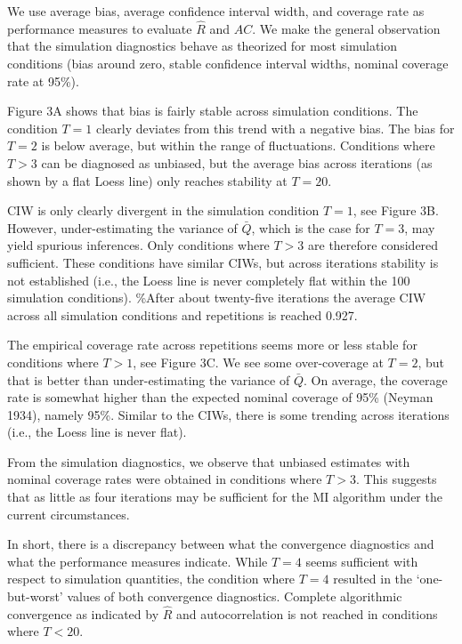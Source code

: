 \documentclass[
  Royal, times, sageapa]{sagej}
\begin{document}
We use average bias, average confidence interval width, and coverage
rate as performance measures to evaluate \(\widehat{R}\) and \(AC\). We
make the general observation that the simulation diagnostics behave as
theorized for most simulation conditions (bias around zero, stable
confidence interval widths, nominal coverage rate at 95\%).

Figure 3A shows that bias is fairly stable across simulation conditions.
The condition \(T=1\) clearly deviates from this trend with a negative
bias. The bias for \(T=2\) is below average, but within the range of
fluctuations. Conditions where \(T>3\) can be diagnosed as unbiased, but
the average bias across iterations (as shown by a flat Loess line) only
reaches stability at \(T=20\).

CIW is only clearly divergent in the simulation condition \(T=1\), see
Figure 3B. However, under-estimating the variance of \(\bar{Q}\), which
is the case for \(T=3\), may yield spurious inferences. Only conditions
where \(T>3\) are therefore considered sufficient. These conditions have
similar CIWs, but across iterations stability is not established (i.e.,
the Loess line is never completely flat within the 100 simulation
conditions). \%After about twenty-five iterations the average CIW across
all simulation conditions and repetitions is reached 0.927.

The empirical coverage rate across repetitions seems more or less stable
for conditions where \(T>1\), see Figure 3C. We see some over-coverage
at \(T=2\), but that is better than under-estimating the variance of
\(\bar{Q}\). On average, the coverage rate is somewhat higher than the
expected nominal coverage of 95\% (Neyman 1934), namely 95\%. Similar to
the CIWs, there is some trending across iterations (i.e., the Loess line
is never flat).

From the simulation diagnostics, we observe that unbiased estimates with
nominal coverage rates were obtained in conditions where \(T>3\). This
suggests that as little as four iterations may be sufficient for the MI
algorithm under the current circumstances.

In short, there is a discrepancy between what the convergence
diagnostics and what the performance measures indicate. While \(T=4\)
seems sufficient with respect to simulation quantities, the condition
where \(T=4\) resulted in the `one-but-worst' values of both convergence
diagnostics. Complete algorithmic convergence as indicated by
\(\widehat{R}\) and autocorrelation is not reached in conditions where
\(T<20\).
\end{document}
